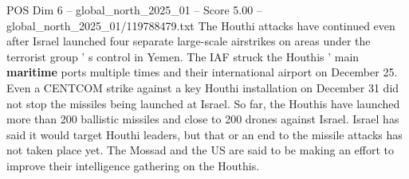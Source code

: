 \begin{textsample}{POS Dim 6 – global\_north\_2025\_01 – Score 5.00 – global\_north\_2025\_01/119788479.txt}
The Houthi attacks have continued even after Israel launched four separate large-scale airstrikes on areas under the terrorist group ' s control in Yemen.
The IAF struck the Houthis ' main \textbf{maritime} ports multiple times and their international airport on December 25.
Even a CENTCOM strike against a key Houthi installation on December 31 did not stop the missiles being launched at Israel.
So far, the Houthis have launched more than 200 ballistic missiles and close to 200 drones against Israel.
Israel has said it would target Houthi leaders, but that or an end to the missile attacks has not taken place yet.
The Mossad and the US are said to be making an effort to improve their intelligence gathering on the Houthis.

\end{textsample}
